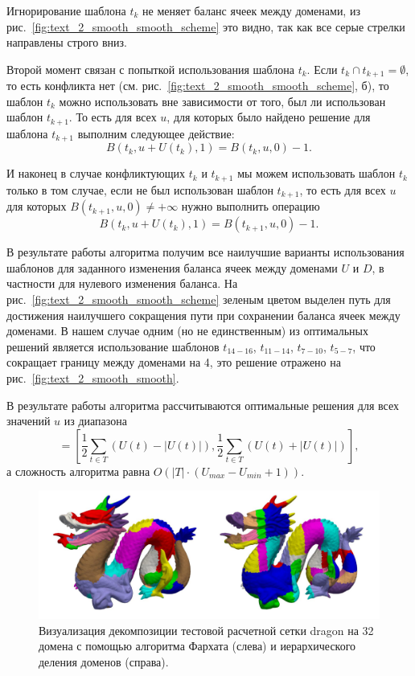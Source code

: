 Игнорирование шаблона $t_k$ не меняет баланс ячеек между доменами, из рис.~\ref{fig:text_2_smooth_smooth_scheme} это видно, так как все серые стрелки направлены строго вниз.

Второй момент связан с попыткой использования шаблона $t_k$.
Если $t_k \cap t_{k + 1} = \emptyset$, то есть конфликта нет (см. рис.~\ref{fig:text_2_smooth_smooth_scheme}, б), то шаблон $t_k$ можно использовать вне зависимости от того, был ли использован шаблон $t_{k + 1}$.
То есть для всех $u$, для которых было найдено решение для шаблона $t_{k + 1}$ выполним следующее действие:
\begin{equation}
	B(t_k, u + U(t_k), 1) = B(t_k, u, 0) - 1.
\end{equation}

И наконец в случае конфликтующих $t_k$ и $t_{k + 1}$ мы можем использовать шаблон $t_k$ только в том случае, если не был использован шаблон $t_{k + 1}$, то есть для всех $u$ для которых $B(t_{k + 1}, u, 0) \ne +\infty$ нужно выполнить операцию
\begin{equation}
	B(t_k, u + U(t_k), 1) = B(t_{k + 1}, u, 0) - 1.
\end{equation}

В результате работы алгоритма получим все наилучшие варианты использования шаблонов для заданного изменения баланса ячеек между доменами $U$ и $D$, в частности для нулевого изменения баланса.
На рис.~\ref{fig:text_2_smooth_smooth_scheme} зеленым цветом выделен путь для достижения наилучшего сокращения пути при сохранении баланса ячеек между доменами.
В нашем случае одним (но не единственным) из оптимальных решений является использование шаблонов $t_{14-16}$, $t_{11-14}$, $t_{7-10}$, $t_{5-7}$, что сокращает границу между доменами на 4, это решение отражено на рис.~\ref{fig:text_2_smooth_smooth}.

В результате работы алгоритма рассчитываются оптимальные решения для всех значений $u$ из диапазона
\begin{equation}
	[U_{min}, U_{max}] = \left[ \frac{1}{2} \sum_{t \in T}{(U(t) - |U(t)|)}, \frac{1}{2} \sum_{t \in T}{(U(t) + |U(t)|)} \right],
\end{equation}
а сложность алгоритма равна $O \left( |T| \cdot (U_{max} - U_{min} + 1) \right)$.

\begin{figure}[ht]
\centering
\includegraphics[width=1.0\textwidth]{fig/par_dragon_decomp.pdf}
\singlespacing
{}\caption{Визуализация декомпозиции тестовой расчетной сетки dragon на 32 домена с помощью алгоритма Фархата (слева) и иерархического деления доменов (справа).}
\label{fig:text_2_smooth_decomp}
\end{figure}

